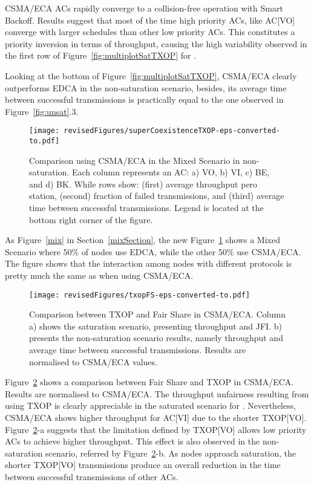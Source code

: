 \documentclass[a4paper]{article}
\begin{document}
CSMA/ECA ACs rapidly converge to a collision-free operation with Smart Backoff. Results suggest that most of the time high priority ACs, like AC[VO] converge with larger schedules than other low priority ACs. This constitutes a priority inversion in terms of throughput, causing the high variability observed in the first row of Figure~\ref{fig:multiplotSatTXOP} for . 

Looking at the bottom of Figure~\ref{fig:multiplotSatTXOP}, CSMA/ECA clearly outperforms EDCA in the non-saturation scenario, besides, its average time between successful transmissions is practically equal to the one observed in Figure~\ref{fig:unsat}.3.

	\begin{figure}[t]
	\centering
		\texttt{[image: revisedFigures/superCoexistenceTXOP-eps-converted-to.pdf]}
		\caption{Comparison using CSMA/ECA in the Mixed Scenario in non-saturation. Each column represents an AC: a) VO, b) VI, c) BE, and d) BK. While rows show: (first) average throughput pero station, (second) fraction of failed transmissions, and (third) average time between successful transmissions. Legend is located at the bottom right corner of the figure.}
		\label{mixTXOP}
	\end{figure}

As Figure~\ref{mix} in Section~\ref{mixSection}, the new Figure~\ref{mixTXOP} shows a Mixed Scenario where 50\% of nodes use EDCA, while the other 50\% use CSMA/ECA. The figure shows that the interaction among nodes with different protocols is pretty much the same as when using CSMA/ECA.

	\begin{figure}[t]
	\centering
		\texttt{[image: revisedFigures/txopFS-eps-converted-to.pdf]}
		\caption{Comparison between TXOP and Fair Share in CSMA/ECA. Column a) shows the saturation scenario, presenting throughput and JFI. b) presents the non-saturation scenario results, namely throughput and average time between successful transmissions. Results are normalised to CSMA/ECA values.}
		\label{txopFS}
	\end{figure}

Figure~\ref{txopFS} shows a comparison between Fair Share and TXOP in CSMA/ECA. Results are normalised to CSMA/ECA. The throughput unfairness resulting from using TXOP is clearly appreciable in the saturated scenario for . Nevertheless, CSMA/ECA shows higher throughput for AC[VI] due to the shorter TXOP[VO]. Figure~\ref{txopFS}-a suggests that the limitation defined by TXOP[VO] allows low priority ACs to achieve higher throughput. This effect is also observed in the non-saturation scenario, referred by Figure~\ref{txopFS}-b. As nodes approach saturation, the shorter TXOP[VO] transmissions  produce an overall reduction in the time between successful transmissions of other ACs.
\end{document}
